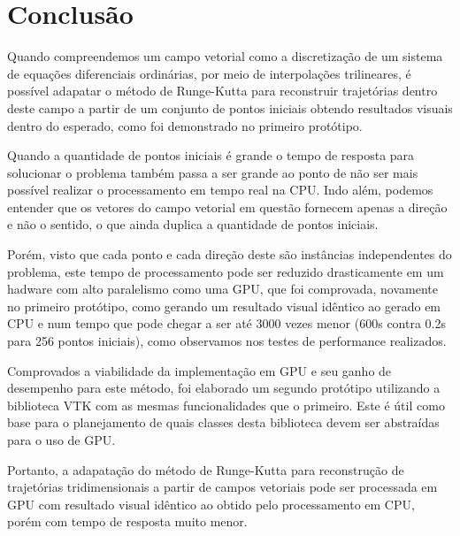 \chapter{Conclusão}
Quando compreendemos um campo vetorial como a discretização de um sistema de equações diferenciais ordinárias, por meio de interpolações trilineares, é possível adapatar o método de Runge-Kutta para reconstruir trajetórias dentro deste campo a partir de um conjunto de pontos iniciais obtendo resultados visuais dentro do esperado, como foi demonstrado no primeiro protótipo.

Quando a quantidade de pontos iniciais é grande o tempo de resposta para solucionar o problema também passa a ser grande ao ponto de não ser mais possível realizar o processamento em tempo real na CPU. Indo além, podemos entender que os vetores do campo vetorial em questão fornecem apenas a direção e não o sentido, o que ainda duplica a quantidade de pontos iniciais.

Porém, visto que cada ponto e cada direção deste são instâncias independentes do problema, este tempo de processamento pode ser reduzido drasticamente em um hadware com alto paralelismo como uma GPU, que foi comprovada, novamente no primeiro protótipo, como gerando um resultado visual idêntico ao gerado em CPU e num tempo que pode chegar a ser até 3000 vezes menor (600s contra 0.2s para 256 pontos iniciais), como observamos nos testes de performance realizados.

Comprovados a viabilidade da implementação em GPU e seu ganho de desempenho para este método, foi elaborado um segundo protótipo utilizando a biblioteca VTK com as mesmas funcionalidades que o primeiro. Este é útil como base para o planejamento de quais classes desta biblioteca devem ser abstraídas para o uso de GPU.

Portanto, a adapatação do método de Runge-Kutta para reconstrução de trajetórias tridimensionais a partir de campos vetoriais pode ser processada em GPU com resultado visual idêntico ao obtido pelo processamento em CPU, porém com tempo de resposta muito menor.

